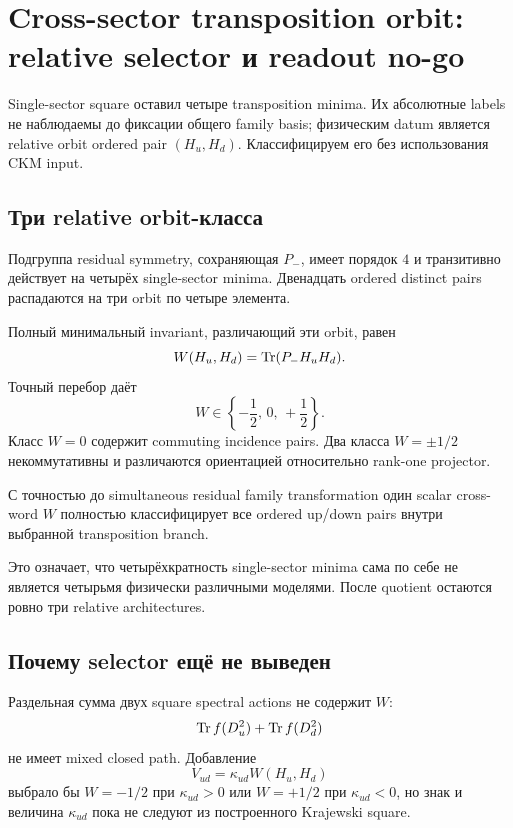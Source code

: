 \chapter{Cross-sector transposition orbit: relative selector и readout no-go}

Single-sector square оставил четыре transposition minima. Их абсолютные
labels не наблюдаемы до фиксации общего family basis; физическим datum
является relative orbit ordered pair \((H_u,H_d)\). Классифицируем его без
использования CKM input.

\section{Три relative orbit-класса}

Подгруппа residual symmetry, сохраняющая \(P_-\), имеет порядок \(4\) и
транзитивно действует на четырёх single-sector minima. Двенадцать ordered
distinct pairs распадаются на три orbit по четыре элемента.

Полный минимальный invariant, различающий эти orbit, равен
\begin{equation}
 W(H_u,H_d)=\operatorname{Tr}(P_-H_uH_d).
\end{equation}
Точный перебор даёт
\begin{equation}
 W\in\left\{-\frac12,\,0,\,+\frac12\right\}.
\end{equation}
Класс \(W=0\) содержит commuting incidence pairs. Два класса
\(W=\pm1/2\) некоммутативны и различаются ориентацией относительно
rank-one projector.

\begin{proposition}
С точностью до simultaneous residual family transformation один scalar
cross-word \(W\) полностью классифицирует все ordered up/down pairs внутри
выбранной transposition branch.
\end{proposition}

Это означает, что четырёхкратность single-sector minima сама по себе не
является четырьмя физически различными моделями. После quotient остаются
ровно три relative architectures.

\section{Почему selector ещё не выведен}

Раздельная сумма двух square spectral actions не содержит \(W\):
\begin{equation}
 \operatorname{Tr} f(D_u^2)+\operatorname{Tr} f(D_d^2)
\end{equation}
не имеет mixed closed path. Добавление
\begin{equation}
 V_{ud}=\kappa_{ud}W(H_u,H_d)
\end{equation}
выбрало бы \(W=-1/2\) при \(\kappa_{ud}>0\) или \(W=+1/2\) при
\(\kappa_{ud}<0\), но знак и величина \(\kappa_{ud}\) пока не следуют из
построенного Krajewski square.


